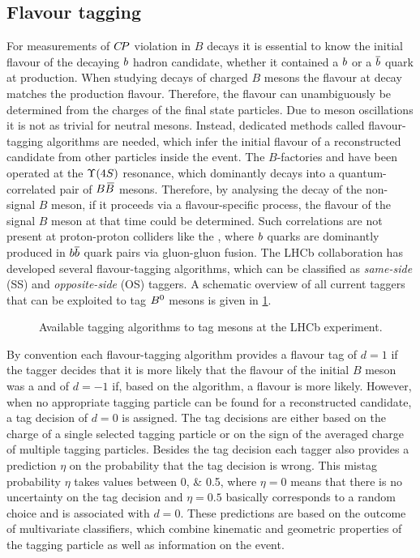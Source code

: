 
\subsection{Flavour tagging}
\label{sec:detector:software:tagging}

For measurements of ${C\!P}$ violation in $B$ decays it is essential to know the
initial flavour of the decaying ${b}$ hadron candidate, \ie whether it
contained a ${b}$ or a ${\overline {{b}}}$ quark at production. When studying
decays of charged $B$ mesons the flavour at decay matches the production
flavour. Therefore, the flavour can unambiguously be determined from the
charges of the final state particles. Due to meson oscillations it is not as
trivial for neutral mesons. Instead, dedicated methods called flavour-tagging
algorithms are needed, which infer the initial flavour of a reconstructed
candidate from other particles inside the event. The $B$-factories \babar and
\belle have been operated at the $\FourS$ resonance, which dominantly decays into a
quantum-correlated pair of $B{\kern 0.18em\overline{\kern -0.18em B}{}}$ mesons. Therefore, by analysing the decay
of the non-signal $B$ meson, \eg if it proceeds via a flavour-specific
process, the flavour of the signal $B$ meson at that time could be determined.
Such correlations are not present at proton-proton colliders like the \lhc,
where ${b}$ quarks are dominantly produced in ${{b}{\overline {{b}}}}$ quark pairs via
gluon-gluon fusion. The LHCb collaboration has developed several
flavour-tagging algorithms, which can be classified as \emph{same-side} (SS)
and \emph{opposite-side} (OS) taggers. A schematic overview of all current taggers
that can be exploited to tag ${{B}^0}$ mesons is given in
\cref{fig:detector:tagging:schematics}.
\begin{figure}[htb]
\centering

\caption{Available tagging algorithms to tag \Bz mesons at the LHCb experiment.}
\label{fig:detector:tagging:schematics}
\end{figure}
By convention each flavour-tagging algorithm provides a flavour tag of $d =
\num{+1}$ if the tagger decides that it is more likely that the flavour of the
initial $B$ meson was a \Bz and of $d = \num{-1}$ if, based on the algorithm,
a \Bzb flavour is more likely. However, when no appropriate tagging particle
can be found for a reconstructed candidate, a tag decision of $d = 0$ is
assigned. The tag decisions are either based on the charge of a single
selected tagging particle or on the sign of the averaged charge of multiple
tagging particles. Besides the tag decision each tagger also provides a
prediction $\eta$ on the probability that the tag decision is wrong. This
mistag probability $\eta$ takes values between \numlist{0;0.5}, where $\eta =
0$ means that there is no uncertainty on the tag decision and $\eta = 0.5$
basically corresponds to a random choice and is associated with $d = 0$. These
predictions are based on the outcome of multivariate classifiers, which
combine kinematic and geometric properties of the tagging particle as well as
information on the event.

